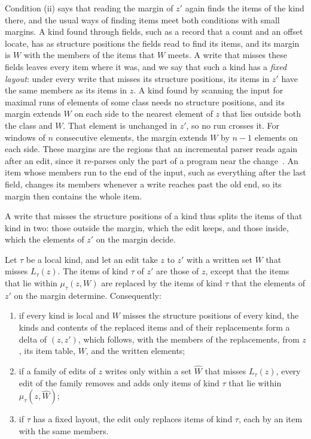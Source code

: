 \noindent Condition (ii) says that reading the margin of $z'$ again finds the items of the kind there, and the usual
ways of finding items meet both conditions with small margins. A kind found through fields, such as a record that a
count and an offset locate, has as structure positions the fields read to find its items, and its margin is $W$ with
the members of the items that $W$ meets. A write that misses these fields leaves every item where it was, and we say
that such a kind has a \emph{fixed layout}: under every write that misses its structure positions, its items in $z'$
have the same members as its items in $z$. A kind found by scanning the input for maximal runs of elements of some
class needs no structure positions, and its margin extends $W$ on each side to the nearest element of $z$ that lies
outside both the class and $W$. That element is unchanged in $z'$, so no run crosses it. For windows of $n$
consecutive elements, the margin extends $W$ by $n - 1$ elements on each side. These margins are the regions that an
incremental parser reads again after an edit, since it re-parses only the part of a program near the
change~\cite{wagner1998efficient}. An item whose members run to the end of the input, such as everything after the last
field, changes its members whenever a write reaches past the old end, so its margin then contains the whole item.

A write that misses the structure positions of a kind thus splits the items of that kind in two: those outside the
margin, which the edit keeps, and those inside, which the elements of $z'$ on the margin decide.

\lemma[Localization]
\label{lem:fw:localization}
{
Let $\tau$ be a local kind, and let an edit take $z$ to $z'$ with a written set $W$ that misses $L_\tau(z)$. The items
of kind $\tau$ of $z'$ are those of $z$, except that the items that lie within $\mu_\tau(z, W)$ are replaced by the
items of kind $\tau$ that the elements of $z'$ on the margin determine. Consequently:
\begin{enumerate}[label=(\roman*), leftmargin=*, nosep]
  \item if every kind is local and $W$ misses the structure positions of every kind, the kinds and contents of the
    replaced items and of their replacements form a delta of $(z, z')$, which follows, with the members of the
    replacements, from $z$, its item table, $W$, and the written elements;
  \item if a family of edits of $z$ writes only within a set $\hat{W}$ that misses $L_\tau(z)$, every edit of the
    family removes and adds only items of kind $\tau$ that lie within $\mu_\tau(z, \hat{W})$;
  \item if $\tau$ has a fixed layout, the edit only replaces items of kind $\tau$, each by an item with the same
    members.
\end{enumerate}
}

